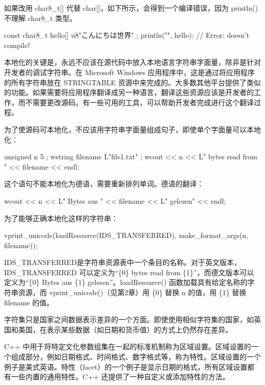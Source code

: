 如果改用 char8\_t[] 代替 char[]，如下所示，会得到一个编译错误，因为 println() 不理解 char8\_t 类型。

\begin{cpp}
const char8_t hello[] { u8"こんにちは世界" };
println("{}", hello); // Error: doesn't compile!
\end{cpp}


本地化的关键是，永远不应该在源代码中放入本地语言字符串字面量，除非是针对开发者的调试字符串。在 Microsoft Windows 应用程序中，这是通过将应用程序的所有字符串放在 STRINGTABLE 资源中来完成的。大多数其他平台提供了类似的功能。如果需要将应用程序翻译成另一种语言，翻译这些资源应该是开发者的工作，而不需要更改源码。有一些可用的工具，可以帮助开发者完成进行这个翻译过程。

为了使源码可本地化，不应该用字符串字面量组成句子，即使单个字面量可以本地化：

\begin{cpp}
unsigned n { 5 };
wstring filename { L"file1.txt" };
wcout << n << L" bytes read from " << filename << endl;
\end{cpp}

这个语句不能本地化为德语，需要重新排列单词。德语的翻译：

\begin{cpp}
wcout << n << L" Bytes aus " << filename << L" gelezen" << endl;
\end{cpp}

为了能够正确本地化这样的字符串：

\begin{cpp}
vprint_unicode(loadResource(IDS_TRANSFERRED), make_format_args(n, filename));
\end{cpp}

IDS\_TRANSFERRED是字符串资源表中一个条目的名称。对于英文版本，IDS\_TRANSFERRED 可以定义为“\{0\} bytes read from \{1\}”，而德文版本可以定义为“\{0\} Bytes aus \{1\} gelesen”。loadResource() 函数加载具有给定名称的字符串资源，而 vprint\_unicode()（见第2章）用 \{0\} 替换 n 的值，用 \{1\} 替换 filename 的值。


字符集只是国家之间数据表示差异的一个方面。即使使用相似字符集的国家，如英国和美国，在表示某些数据（如日期和货币值）的方式上仍然存在差异。

C++ 中用于将特定文化参数组集在一起的标准机制称为区域设置。区域设置的一个组成部分，例如日期格式、时间格式、数字格式等，称为特性。区域设置的一个例子是美式英语。特性（facet）的一个例子是显示日期的格式，所有区域设置都有一些内置的通用特性。C++ 还提供了一种自定义或添加特性的方法。

